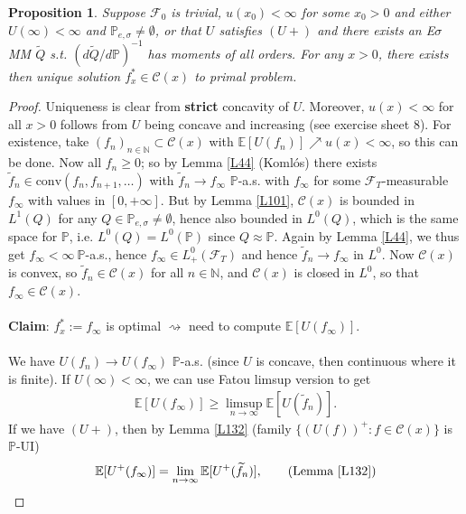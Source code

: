 \documentclass[12pt,a4paper, twoside]{article}
\newtheorem{prop}{Proposition}[section]
\theoremstyle{definition}
\newcommand{\EE}{\mathbb{E}} %
\newcommand{\PP}{\mathbb{P}} %
\begin{document}
\begin{prop} \label{P133} Suppose $\mathcal{F}_0$ is trivial,  $u(x_0) < \infty$ for some $x_0 >0$ and either $U( \infty) < \infty$ and $\PP_{e, \sigma} \neq \emptyset$, or that $U$ satisfies $(U+)$ and there exists an E$\sigma$MM $\widetilde{Q}$ s.t. $(d \widetilde{Q} / d \PP)^{-1}$ has moments of all orders. For any $x>0$, there exists then unique solution $f_x^* \in \mathcal{C}(x)$ to primal problem. 
\end{prop}
\begin{proof}
Uniqueness is clear from \textbf{strict} concavity of $U$. Moreover, $u(x) < \infty$ for all $x>0$ follows from $U$ being concave and increasing (see exercise sheet $8$). For existence,  take $(f_n)_{n \in \mathbb{N}} \subset \mathcal{C}(x)$ with $\EE[U(f_n)] \nearrow u(x) < \infty$, so this can be done. Now all $f_n \geq 0$; so by Lemma \ref{L44} (Komlós) there exists $\widetilde{f}_n \in \text{conv}(f_n, f_{n+1}, \dots )$ with $\widetilde{f}_n \to f_\infty$ $\PP$-a.s. with $f_\infty$ for some $\mathcal{F}_T$-measurable $f_\infty$ with values in $[0, + \infty]$. But by Lemma \ref{L101}, $\mathcal{C}(x)$ is bounded in $L^1(Q)$ for any $Q \in \PP_{e, \sigma} \neq \emptyset$, hence also bounded in $L^0(Q)$, which is the same space for $\PP$,  i.e. $L^0(Q)= L^0(\PP)$ since $Q \approx \PP$. Again by Lemma \ref{L44}, we thus get $f_\infty < \infty \ \PP$-a.s., hence $f_\infty \in L_+^0( \mathcal{F}_T)$ and hence $\widetilde{f}_n \to f_\infty$ in $L^0$. 
\newpage
Now $\mathcal{C}(x)$ is convex, so $\widetilde{f}_n \in \mathcal{C}(x)$ for all $n \in \mathbb{N}$, and $\mathcal{C}(x)$ is closed in $L^0$, so that $f_\infty \in \mathcal{C}(x)$. 
\\\\
\textbf{Claim}: $f_x^*:= f_\infty$ is optimal $\rightsquigarrow$ need to compute $\EE[U(f_\infty)]$. \\
\\
We have $U(f_n) \to U(f_\infty)$ $\PP$-a.s. (since $U$ is concave, then continuous where it is finite). If $U( \infty)< \infty$, we can use Fatou limsup version to get 
\begin{align*}
\EE[U(f_\infty)] \geq \limsup_{n \to \infty} \EE[U( \widetilde{f}_n)].
\end{align*}
If we have $(U+)$, then by Lemma \ref{L132} (family $\{(U(f))^+: f \in \mathcal{C}(x)\}$ is $\PP$-UI)
\begin{align*}
& \EE[U^+(f_\infty)] = \lim_{n \to \infty} \EE[U^+( \widetilde{f}_n)], \tag{Lemma \ref{L132}} \\

\end{align*}
\end{proof}
\end{document}
